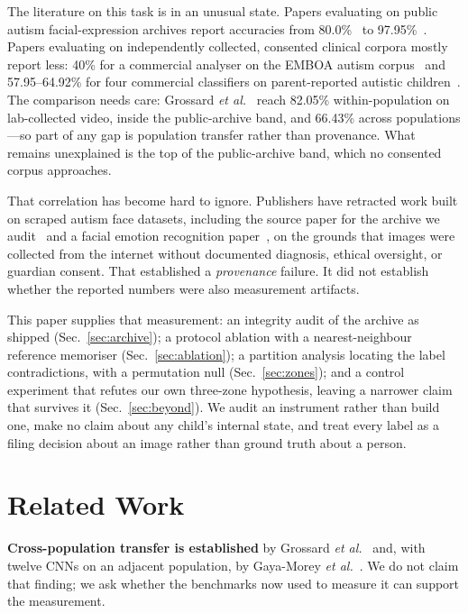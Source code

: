 \documentclass[conference,10pt]{IEEEtran}
\begin{document}
The literature on this task is in an unusual state. Papers evaluating on public
autism facial-expression archives report accuracies from
80.0\%~\cite{radocaj2025} to 97.95\%~\cite{hanumantharayappa2026}. Papers
evaluating on independently collected, consented clinical corpora mostly report
less: 40\% for a commercial analyser on the EMBOA autism
corpus~\cite{kiejdo2025} and 57.95--64.92\% for four commercial classifiers on
parent-reported autistic children~\cite{kalantarian2020}. The comparison needs care:
Grossard \emph{et al.}~\cite{grossard2020} reach 82.05\% within-population on
lab-collected video, inside the public-archive band, and 66.43\% across
populations---so part of any gap is population transfer rather than provenance.
What remains unexplained is the top of the public-archive band, which no
consented corpus approaches.

That correlation has become hard to ignore. Publishers have retracted work built
on scraped autism face datasets, including the source paper for the archive we
audit~\cite{talaat2023retracted} and a facial emotion recognition
paper~\cite{gungor2025retracted}, on the grounds that images were collected from
the internet without documented diagnosis, ethical oversight, or guardian
consent. That established a \emph{provenance} failure. It did not establish
whether the reported numbers were also measurement artifacts.

This paper supplies that measurement: an integrity audit of the archive as
shipped (Sec.~\ref{sec:archive}); a protocol ablation with a nearest-neighbour
reference memoriser (Sec.~\ref{sec:ablation}); a partition analysis locating the
label contradictions, with a permutation null (Sec.~\ref{sec:zones}); and a
control experiment that refutes our own three-zone hypothesis, leaving a
narrower claim that survives it (Sec.~\ref{sec:beyond}). We audit an instrument
rather than build one, make no claim about any child's internal state, and treat
every label as a filing decision about an image rather than ground truth about a
person.

\section{Related Work}
\textbf{Cross-population transfer is established} by Grossard \emph{et
al.}~\cite{grossard2020} and, with twelve CNNs on an adjacent population, by
Gaya-Morey \emph{et al.}~\cite{gayamorey2026}. We do not claim that finding; we
ask whether the benchmarks now used to measure it can support the measurement.
\end{document}
